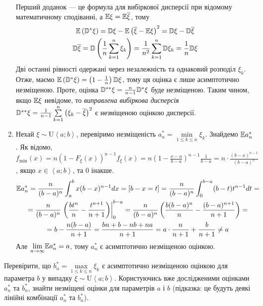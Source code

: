 \begin{samepage}
\begin{example}
\begin{enumerate}
            Перший доданок --- це формула для вибіркової дисперсії при відомому математичному сподіванні, а 
            $\mathbb{E}\xi = \mathbb{E}\overline{\xi}$, тому
            \begin{gather*}
                \mathbb{E}\left( \mathbb{D}^* \xi\right) = \mathbb{D}\xi - \mathbb{E}\left(\overline{\xi} - \mathbb{E}\xi\right)^2= \mathbb{D}\xi - \mathbb{D}\overline{\xi} \\
                \mathbb{D}\overline{\xi} = \mathbb{D}\left(\frac{1}{n}\sum\limits_{k=1}^n \xi_k \right) = \frac{1}{n^2} \sum\limits_{k=1}^n \mathbb{D}\xi_k = \frac{1}{n} \mathbb{D}\xi
            \end{gather*}
            Дві останні рівності одержані через незалежність та однаковий розподіл $\xi_k$. Отже, маємо $\mathbb{E}\left( \mathbb{D}^* \xi\right) = \left( 1- \frac{1}{n}\right) \mathbb{D}\xi$,
            тому ця оцінка є лише асимптотично незміщеною. Проте, оцінка $\mathbb{D}^{**}\xi = \frac{n}{n-1} \mathbb{D}^*\xi$ буде незміщеною.
            Таким чином, якщо $\mathbb{E}\xi$ невідоме, то \emph{виправлена вибіркова дисперсія} 
            $\mathbb{D}^{**}\xi = \frac{1}{n-1} \sum\limits_{k=1}^n \left(\xi_k - \overline{\xi} \right)^2$ є незміщеною оцінкою дисперсії.
            \item Нехай $\xi \sim \mathrm{U}\left< a; b\right>$, перевіримо незміщеність $a^*_n = \underset{1\leq k \leq n}{\min}\xi_k$.
            Знайдемо $\mathbb{E} a^*_n$. Як відомо, 
            $f_{\min}(x) = n \left(1-F_{\xi}(x)\right)^{n-1} f_{\xi}(x) = n\left( 1- \frac{x-a}{b-a}\right)^{n-1}\frac{1}{b-a} = n\cdot\frac{(b-x)^{n-1}}{(b-a)^n}$, якщо
            $x \in \left< a; b\right>$, та $0$ інакше.
            \begin{gather*}
                \mathbb{E} a^*_n = \frac{n}{(b-a)^n} \int_a^b x(b-x)^{n-1} dx = \left[ b-x = t \right] = 
                \frac{n}{(b-a)^n} \int_0^{b-a} (b-t)t^{n-1} dt = \\
                = \frac{n}{(b-a)^n} \left.\left( \frac{bt^n}{n} - \frac{t^{n+1}}{n+1}\right)\right|_0^{b-a} = 
                \frac{n}{(b-a)^n} \left(\frac{b(b-a)^n}{n} - \frac{(b-a)^{n+1}}{n+1}\right) = \\
                = b - \frac{n(b-a)}{n+1} = \frac{bn + b - nb + na}{n+1} = a \cdot \frac{n}{n+1} + \frac{b}{n+1} \neq a
             \end{gather*}
             Але $\underset{n\to\infty}{\lim} \mathbb{E} a^*_n = a$, тому $a^*_n$ є асимптотично незміщеною оцінкою.
        \end{enumerate}
     \end{example}
 \end{samepage}
 \begin{exercise}
     Перевірити, що $b^*_n = \underset{1\leq k \leq n}{\max}\xi_k$ є асимптотично незміщеною оцінкою для параметра $b$ у випадку $\xi \sim \mathrm{U}\left< a; b\right>$.
     Користуючись вже дослідженими оцінками $a^*_n$ та $b^*_n$, знайти незміщені оцінки для параметрів $a$ і $b$ (підказка: це будуть деякі лінійні комбінації $a^*_n$ та $b^*_n$).
 \end{exercise}

